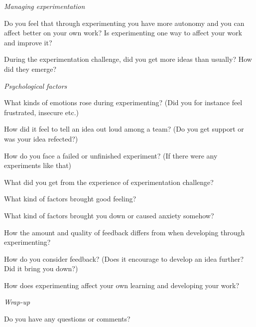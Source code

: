\noindent\emph{Managing experimentation}
\vspace{-3mm} 
\begin{list}{*}{}
\setlength{\itemsep}{-3pt}
     \item  Do you feel that through experimenting you have more autonomy and you can affect better on your own work? Is experimenting one way to affect your work and improve it? 
    \item During the experimentation challenge, did you get more ideas than usually? How did they emerge?
    
\end{list}

\noindent\emph{Psychological factors}
\vspace{-3mm} 
\begin{list}{*}{}
\setlength{\itemsep}{-3pt}
\item What kinds of emotions rose during experimenting? (Did you for instance feel frustrated, insecure etc.)
\item How did it feel to tell an idea out loud among a team? (Do you get support or was your idea refected?)
\item How do you face a failed or unfinished experiment? (If there were any experiments like that)
\item What did you get from the experience of experimentation challenge?
\item What kind of factors brought good feeling? 
\item What kind of factors brought you down or caused anxiety somehow? 

\item How the amount and quality of feedback differs from when developing through experimenting?
\item How do you consider feedback? (Does it encourage to develop an idea further? Did it bring you down?)
\item  How does experimenting affect your own learning and developing your work? 
\end{list}

\noindent\emph{Wrap-up} 
\vspace{-3mm} 
\begin{list}{*}{}
\setlength{\itemsep}{-3pt}
\item Do you have any questions or comments?
\end{list}

\label{appendices-end}